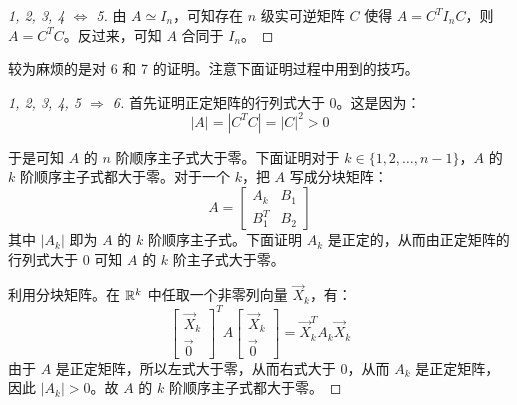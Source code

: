 \begin{proof}[1, 2, 3, 4 $\Longleftrightarrow$ 5]
	由 $A \simeq I_n$，可知存在 $n$ 级实可逆矩阵 $C$ 使得 $A = C^T I_n C$，则 $A = C^T C$。反过来，可知 $A$ 合同于 $I_n$。
\end{proof}

较为麻烦的是对 6 和 7 的证明。注意下面证明过程中用到的技巧。

\begin{proof}[1, 2, 3, 4, 5 $\Longrightarrow$ 6]
	首先证明正定矩阵的行列式大于 $0$。这是因为：
	$$
	|A| = |C^T C| = |C|^2 > 0
	$$

	于是可知 $A$ 的 $n$ 阶顺序主子式大于零。下面证明对于 $k \in \{ 1, 2, \ldots, n - 1 \}$，$A$ 的 $k$ 阶顺序主子式都大于零。对于一个 $k$，把 $A$ 写成分块矩阵：
	$$
	A =
	\begin{bmatrix} A_k & B_1 \\ B_1^T & B_2 \end{bmatrix}
	$$
	其中 $|A_k|$ 即为 $A$ 的 $k$ 阶顺序主子式。下面证明 $A_k$ 是正定的，从而由正定矩阵的行列式大于 $0$ 可知 $A$ 的 $k$ 阶主子式大于零。

	利用分块矩阵。在 $\mathbb R^k$ 中任取一个非零列向量 $\vec X_k$，有：
	$$
	\begin{bmatrix} \vec X_k \\ \vec 0 \end{bmatrix}^T
	A
	\begin{bmatrix} \vec X_k \\ \vec 0 \end{bmatrix}
	=
	\vec X_k^T A_k \vec X_k
	$$
	由于 $A$ 是正定矩阵，所以左式大于零，从而右式大于 $0$，从而 $A_k$ 是正定矩阵，因此 $|A_k| > 0$。故 $A$ 的 $k$ 阶顺序主子式都大于零。
\end{proof}

